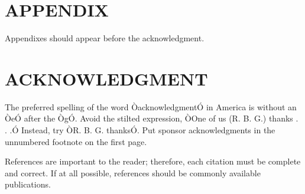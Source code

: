 \documentclass[a4paper, 10pt, conference]{ieeeconf}      %
\begin{document}
\begin{multicol}{2}
	
	
	
	
	
	\section*{APPENDIX}
	
	Appendixes should appear before the acknowledgment.
	
	\section*{ACKNOWLEDGMENT}
	
	The preferred spelling of the word ÒacknowledgmentÓ in America is without an ÒeÓ after the ÒgÓ. Avoid the stilted expression, ÒOne of us (R. B. G.) thanks . . .Ó  Instead, try ÒR. B. G. thanksÓ. Put sponsor acknowledgments in the unnumbered footnote on the first page.
	
	
	
	
	References are important to the reader; therefore, each citation must be complete and correct. If at all possible, references should be commonly available publications.
%	


\end{multicol}
\end{document}
